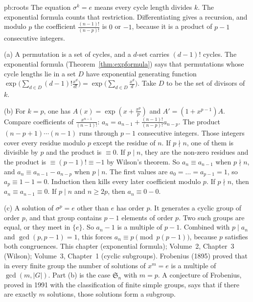 \begin{solution}{pb:roots}
\idea The equation $\sigma^k=e$ means every cycle length divides $k$. The exponential formula counts that restriction. Differentiating gives a recursion, and modulo $p$ the coefficient $\frac{(n-1)!}{(n-p)!}$ is $0$ or $-1$, because it is a product of $p-1$ consecutive integers.

\writeup (a) A permutation is a set of cycles, and a $d$-set carries $(d-1)!$ cycles. The exponential formula
(Theorem~\ref{thm:expformula}) says that permutations whose cycle lengths lie in a set $D$ have exponential generating function
$\exp\bigl(\sum_{d\in D}(d-1)!\frac{x^d}{d!}\bigr)=\exp\bigl(\sum_{d\in D}\frac{x^d}d\bigr)$. Take $D$ to be the set of divisors of $k$.

(b) For $k=p$, one has $A(x)=\exp(x+\frac{x^p}p)$ and $A'=(1+x^{p-1})A$. Compare coefficients of $\frac{x^{n-1}}{(n-1)!}$:
$a_n=a_{n-1}+\frac{(n-1)!}{(n-p)!}a_{n-p}$. The product $(n-p+1)\cdots(n-1)$ runs through $p-1$ consecutive integers. Those integers cover every
residue modulo $p$ except the residue of $n$. If $p\nmid n$, one of them is divisible by $p$ and the product is $\equiv0$. If $p\mid n$,
they are the non-zero residues and the product is $\equiv(p-1)!\equiv-1$ by Wilson's theorem. So $a_n\equiv a_{n-1}$ when $p\nmid n$, and
$a_n\equiv a_{n-1}-a_{n-p}$ when $p\mid n$. The first values are $a_0=\dots=a_{p-1}=1$, so $a_p\equiv1-1=0$. Induction then kills every later coefficient
modulo $p$. If $p\nmid n$, then $a_n\equiv a_{n-1}\equiv0$. If $p\mid n$ and $n\ge2p$, then $a_n\equiv0-0$.

(c) A solution of $\sigma^p=e$ other than $e$ has order $p$. It generates a cyclic group of order $p$, and that group contains
$p-1$ elements of order $p$. Two such groups are equal, or they meet in $\{e\}$. So $a_n-1$ is a multiple of $p-1$. Combined with
$p\mid a_n$ and $\gcd(p,p-1)=1$, this forces $a_n\equiv p\pmod{p(p-1)}$, because $p$ satisfies both congruences.
\tools This chapter (exponential formula); Volume~2, Chapter~3 (Wilson); Volume~3, Chapter~1 (cyclic subgroups).
\leads Frobenius (1895) proved that in every finite group the number of solutions of $x^m=e$ is a multiple of
$\gcd(m,|G|)$. Part (b) is the case $\mathfrak S_n$ with $m=p$. A conjecture of Frobenius, proved in 1991 with the
classification of finite simple groups, says that if there are exactly $m$ solutions, those solutions form a subgroup.
\end{solution}


